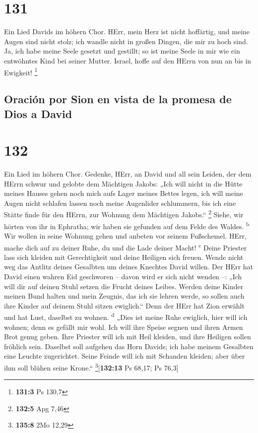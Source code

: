 \hypertarget{section-130}{%
\section{131}\label{section-130}}

 Ein Lied Davids im höhern Chor. HErr, mein Herz ist nicht
hoffärtig, und meine Augen sind nicht stolz; ich wandle nicht in großen
Dingen, die mir zu hoch sind.  Ja, ich habe meine Seele
gesetzt und gestillt; so ist meine Seele in mir wie ein entwöhntes Kind
bei seiner Mutter.  Israel, hoffe auf den HErrn von nun an
bis in Ewigkeit! \footnote{\textbf{131:3} Ps 130,7}

\hypertarget{oraciuxf3n-por-sion-en-vista-de-la-promesa-de-dios-a-david}{%
\subsection{Oración por Sion en vista de la promesa de Dios a
David}\label{oraciuxf3n-por-sion-en-vista-de-la-promesa-de-dios-a-david}}

\hypertarget{section-131}{%
\section{132}\label{section-131}}

 Ein Lied im höhern Chor. Gedenke, HErr, an David und all
sein Leiden,  der dem HErrn schwur und gelobte dem
Mächtigen Jakobs:  „Ich will nicht in die Hütte meines
Hauses gehen noch mich aufs Lager meines Bettes legen, 
ich will meine Augen nicht schlafen lassen noch meine Augenlider
schlummern,  bis ich eine Stätte finde für den HErrn, zur
Wohnung dem Mächtigen Jakobs.`` \footnote{\textbf{132:5} Apg 7,46}
 Siehe, wir hörten von ihr in Ephratha; wir haben sie
gefunden auf dem Felde des Waldes. \textsuperscript{b} 
Wir wollen in seine Wohnung gehen und anbeten vor seinem Fußschemel.
 HErr, mache dich auf zu deiner Ruhe, du und die Lade
deiner Macht! \textsuperscript{c}  Deine Priester lass
sich kleiden mit Gerechtigkeit und deine Heiligen sich freuen.
 Wende nicht weg das Antlitz deines Gesalbten um deines
Knechtes David willen.  Der HErr hat David einen wahren
Eid geschworen -- davon wird er sich nicht wenden --: „Ich will dir auf
deinen Stuhl setzen die Frucht deines Leibes.  Werden
deine Kinder meinen Bund halten und mein Zeugnis, das ich sie lehren
werde, so sollen auch ihre Kinder auf deinem Stuhl sitzen ewiglich.``
 Denn der HErr hat Zion erwählt und hat Lust, daselbst zu
wohnen. \textsuperscript{d}  „Dies ist meine Ruhe
ewiglich, hier will ich wohnen; denn es gefällt mir wohl.
 Ich will ihre Speise segnen und ihren Armen Brot genug
geben.  Ihre Priester will ich mit Heil kleiden, und ihre
Heiligen sollen fröhlich sein.  Daselbst soll aufgehen
das Horn Davids; ich habe meinem Gesalbten eine Leuchte zugerichtet.
 Seine Feinde will ich mit Schanden kleiden; aber über
ihm soll blühen seine Krone.`` \footnote{\textbf{135:8} 2Mo 12,29}{[}\textbf{132:13}
Ps 68,17; Ps 76,3{]}

